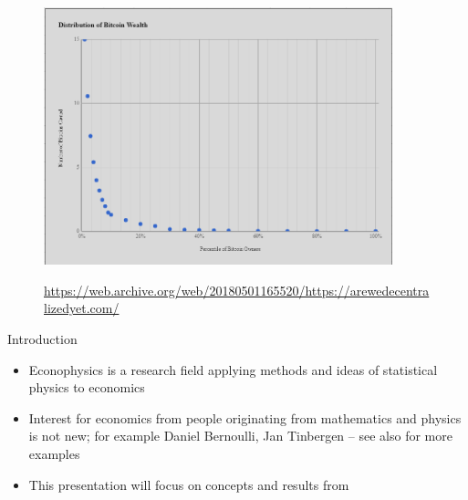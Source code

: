 \documentclass[9pt]{beamer}
\title{\xtitle}
\subtitle{\xsubtitle}
\date{2019-01-23}
\author{\xauthor}
\institute{University of Amsterdam}
\begin{document}
\maketitle



\begin{frame}{}

\begin{figure}
    \centering
    \includegraphics[width=0.9\textwidth]{bitcoin}
    
    \url{https://web.archive.org/web/20180501165520/https://arewedecentralizedyet.com/}
\end{figure}
    
\end{frame}

\begin{frame}{Introduction}
    \begin{itemize}
    \item Econophysics is a research field applying methods and ideas of statistical physics to economics
    \item Interest for economics from people originating from mathematics and physics is not new; for example Daniel Bernoulli, Jan Tinbergen -- see also  for more examples
    \item This presentation will focus on concepts and results from 
    \end{itemize}
\end{frame}
\end{document}
